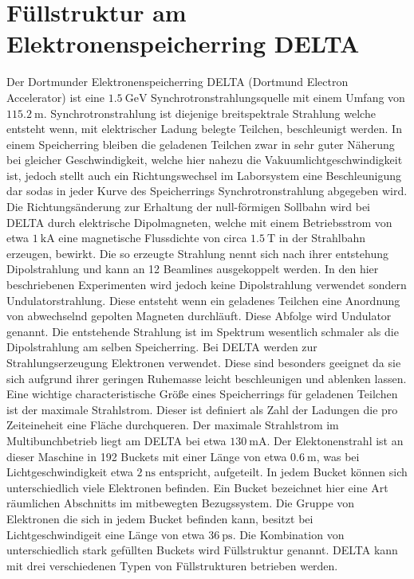 \section{Füllstruktur am Elektronenspeicherring DELTA}
\label{sec:Einleitung}
Der Dortmunder Elektronenspeicherring DELTA (Dortmund Electron Accelerator) ist eine 
$\SI{1,5}{\giga\electronvolt}$ Synchrotronstrahlungsquelle mit einem Umfang von $\SI{115,2}{\meter}$.
Synchrotronstrahlung ist diejenige breitspektrale Strahlung welche entsteht wenn, mit elektrischer Ladung
belegte Teilchen, beschleunigt werden. In einem Speicherring bleiben die geladenen Teilchen zwar in sehr 
guter Näherung bei gleicher Geschwindigkeit, welche hier nahezu die Vakuumlichtgeschwindigkeit ist, 
jedoch stellt auch ein Richtungswechsel im Laborsystem eine Beschleunigung dar sodas in jeder Kurve des
Speicherrings Synchrotronstrahlung abgegeben wird. Die Richtungsänderung zur Erhaltung der null-förmigen
Sollbahn wird bei DELTA durch elektrische Dipolmagneten, welche mit einem Betriebsstrom von etwa
$\SI{1}{\kilo\ampere}$ eine magnetische Flussdichte von circa $\SI{1,5}{\tesla}$ in der Strahlbahn 
erzeugen, bewirkt. Die so erzeugte Strahlung nennt sich nach ihrer entstehung Dipolstrahlung und kann 
an 12 Beamlines ausgekoppelt werden. In den hier beschriebenen Experimenten wird jedoch keine 
Dipolstrahlung verwendet sondern Undulatorstrahlung. Diese entsteht wenn ein geladenes Teilchen eine 
Anordnung von abwechselnd gepolten Magneten durchläuft. Diese Abfolge wird Undulator genannt. Die 
entstehende Strahlung ist im Spektrum wesentlich schmaler als die Dipolstrahlung am selben Speicherring.
Bei DELTA werden zur Strahlungserzeugung Elektronen verwendet. Diese sind besonders geeignet da sie sich
aufgrund ihrer geringen Ruhemasse leicht beschleunigen und ablenken lassen. Eine wichtige 
characteristische Größe eines Speicherrings für geladenen Teilchen ist der maximale Strahlstrom. Dieser 
ist definiert als Zahl der Ladungen die pro Zeiteineheit eine Fläche durchqueren.
Der maximale Strahlstrom im Multibunchbetrieb liegt am DELTA bei etwa $\SI{130}{\milli\ampere}$.
Der Elektonenstrahl ist an dieser Maschine in 192 Buckets mit einer Länge von etwa $\SI{0,6}{\meter}$, was bei Lichtgeschwindigkeit
etwa $\SI{2}{\nano\second}$ entspricht, aufgeteilt. In jedem Bucket können sich unterschiedlich viele 
Elektronen befinden. Ein Bucket bezeichnet hier eine Art räumlichen Abschnitts im mitbewegten Bezugssystem. 
Die Gruppe von Elektronen die sich in jedem Bucket befinden kann, besitzt bei Lichtgeschwindigeit eine 
Länge von etwa $\SI{36}{\pico\second}$. Die Kombination von unterschiedlich stark gefüllten Buckets wird 
Füllstruktur genannt. DELTA kann mit drei verschiedenen Typen von Füllstrukturen betrieben werden.

